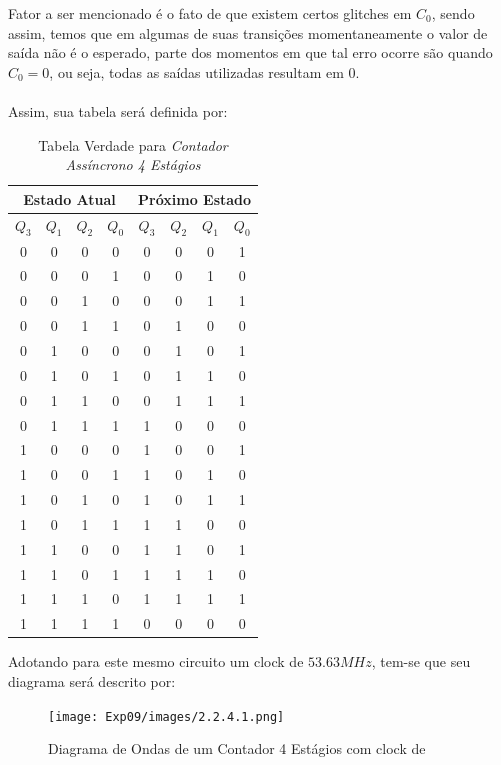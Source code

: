 \documentclass[12pt]{article}
\begin{document}
Fator a ser mencionado é o fato de que existem certos glitches em $C_{0}$, sendo assim, temos que em algumas de suas transições momentaneamente o valor de saída não é o esperado,
parte dos momentos em que tal erro ocorre são quando $C_{0}=0$, ou seja, todas as saídas utilizadas resultam em 0.\\ \\
Assim, sua tabela será definida por:
\begin{table}[H]
    \centering
    \caption{Tabela Verdade para \emph{Contador Assíncrono 4 Estágios}}
    \begin{tabular}{|c|c|c|c|c|c|c|c|}\hline
      \multicolumn{4}{|c|}{Estado Atual} & \multicolumn{4}{|c|}{Próximo Estado} \\\hline
      \textbf{$Q_{3}$} & \textbf{$Q_{1}$} & \textbf{$Q_{2}$} & \textbf{$Q_{0}$} & \textbf{$Q_{3}$} & \textbf{$Q_{2}$} & \textbf{$Q_{1}$} & \textbf{$Q_{0}$} \\\hline
      0 & 0 & 0 & 0 & 0 & 0 & 0 & 1 \\\hline
      0 & 0 & 0 & 1 & 0 & 0 & 1 & 0 \\\hline
      0 & 0 & 1 & 0 & 0 & 0 & 1 & 1 \\\hline
      0 & 0 & 1 & 1 & 0 & 1 & 0 & 0 \\\hline
      0 & 1 & 0 & 0 & 0 & 1 & 0 & 1 \\\hline
      0 & 1 & 0 & 1 & 0 & 1 & 1 & 0 \\\hline
      0 & 1 & 1 & 0 & 0 & 1 & 1 & 1 \\\hline
      0 & 1 & 1 & 1 & 1 & 0 & 0 & 0 \\\hline
      1 & 0 & 0 & 0 & 1 & 0 & 0 & 1 \\\hline
      1 & 0 & 0 & 1 & 1 & 0 & 1 & 0 \\\hline
      1 & 0 & 1 & 0 & 1 & 0 & 1 & 1 \\\hline
      1 & 0 & 1 & 1 & 1 & 1 & 0 & 0 \\\hline
      1 & 1 & 0 & 0 & 1 & 1 & 0 & 1 \\\hline
      1 & 1 & 0 & 1 & 1 & 1 & 1 & 0 \\\hline
      1 & 1 & 1 & 0 & 1 & 1 & 1 & 1 \\\hline
      1 & 1 & 1 & 1 & 0 & 0 & 0 & 0 \\\hline
    \end{tabular}\label{tab:truth_table_latch_rs_triggered}
\end{table}

Adotando para este mesmo circuito um clock de $53.63MHz$, tem-se que seu diagrama será descrito por:
\begin{figure}[H]
  \centering
  \texttt{[image: Exp09/images/2.2.4.1.png]}
  \caption{Diagrama de Ondas de um Contador 4 Estágios com clock de }\label{2.2.4.1.png}
\end{figure}
\end{document}
